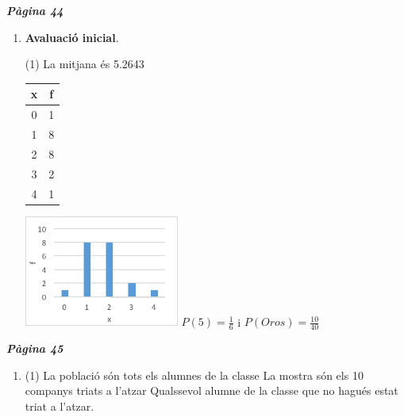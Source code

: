\documentclass[a4paper, pdf, twoside]{book}
\begin{document}
\begin{multicols}{2}

{\textbf{\em Pàgina 44}} \hrulefill
\begin{enumerate}
\vspace{0.25cm}



 \item[$\bullet$ ] {\selectfont\color{blue}\textbf{Avaluació inicial}. } 
 \begin{tasks}[column-sep=1em, item-indent=1.3333em](1)
	 \task La mitjana és 5.2643
	 \task* \begin {tabular}{c|c} x & f \\ \hline 0 & 1 \\ 1 & 8 \\ 2 & 8 \\ 3 & 2 \\ 4 & 1 \\ \end {tabular} \par \includegraphics [width=0.4\textwidth ]{img-sol/t4-0}
	 \task* $P(5)=\frac {1}{6}$ i $P(Oros)=\frac {10}{40}$
\end{tasks}
 \end{enumerate}
\vspace{0.3cm}


{\textbf{\em Pàgina 45}} \hrulefill
\begin{enumerate}
\vspace{0.25cm}



 \item[\fontfamily{phv}\selectfont\color{blue}\textbf{1}. ] 
 \begin{tasks}[column-sep=1em, item-indent=1.3333em](1)
	 \task* La població són tots els alumnes de la classe
	 \task* La mostra són els 10 companys triats a l'atzar
	 \task* Qualssevol alumne de la classe que no hagués estat triat a l'atzar.
\end{tasks}
 \end{enumerate}
\begin{enumerate}
\vspace{0.25cm}



\end{enumerate}
\end{multicols}
\end{document}
